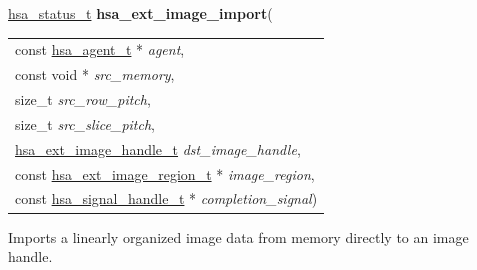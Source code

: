 \documentclass[final]{book}
\newcommand{\hsaarg}[1]{\textit{#1}}
\begin{document}
\noindent\begin{tcolorbox}[breakable,nobeforeafter,colframe=white,colback=lightgray,left=0mm]
\hyperlink{group__status_1gad755322e7ff95456520e8abdbe90d225}{hsa_status_t} \hypertarget{group__images_1ga283fb780e9297c2e29c0011b3d4a06ce}{\textbf{hsa_ext_image_import}}(
\vspace{-3.5mm}\begin{longtable}{@{}p{\textwidth}}
\hspace{1.7em}const \hyperlink{group__topology_1gab8db3fb886332a24acac08ec361e1d86}{hsa_agent_t} * \hsaarg{agent},\\
\hspace{1.7em}const void * \hsaarg{src_memory},\\
\hspace{1.7em}size_t \hsaarg{src_row_pitch},\\
\hspace{1.7em}size_t \hsaarg{src_slice_pitch},\\
\hspace{1.7em}\hyperlink{group__images_1gae59456dc07140b58a2d526bcf01d2d88}{hsa_ext_image_handle_t} \hsaarg{dst_image_handle},\\
\hspace{1.7em}const \hyperlink{group__images_1gada3adaf96ca2ddac605280cae6470b73}{hsa_ext_image_region_t} * \hsaarg{image_region},\\
\hspace{1.7em}const \hyperlink{group__signals_1ga6592c136d70853d855bc11d9efdbf534}{hsa_signal_handle_t} * \hsaarg{completion_signal})\end{longtable}

\end{tcolorbox}
Imports a linearly organized image data from memory directly to an image handle.
\end{document}
